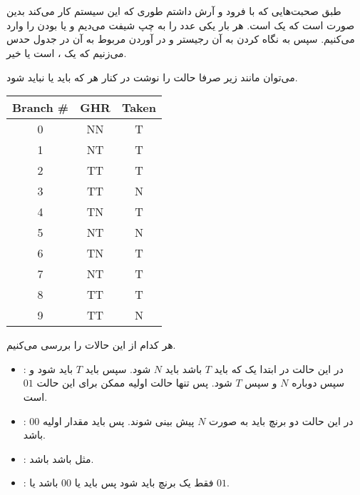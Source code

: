 \section{}
طبق صحبت‌هایی که با فرود و آرش داشتم طوری که این سیستم کار می‌کند بدین صورت است که
یک
است. هر بار یکی عدد را به چپ شیفت می‌دیم و
 یا 
بودن
را وارد می‌کنیم. سپس به نگاه کردن به آن رجیستر و در آوردن
مربوط به آن در جدول
حدس می‌زنیم که یک
،
است یا خیر.

می‌توان مانند زیر صرفا حالت
را نوشت در کنار هر
که باید یا نباید
شود.
\begin{latin}
\centering
\begin{tabular}{|c|c|c|}
    \hline
    Branch \# & GHR & Taken\\
    \hline
    0 & NN & T\\
    \hline
    1 & NT & T\\
    \hline
    2 & TT & T\\
    \hline
    3 & TT & N\\
    \hline
    4 & TN & T\\
    \hline
    5 & NT & N\\
    \hline
    6 & TN & T\\
    \hline
    7 & NT & T\\
    \hline
    8 & TT & T\\
    \hline
    9 & TT & N\\
    \hline
\end{tabular}
\end{latin}
هر کدام از این حالات
را بررسی می‌کنیم.
\begin{itemize}
    \item {}:‌ در این حالت در ابتدا یک
    که باید
    $T$
    باشد باید
    $N$
    شود. سپس باید
    $T$
    باید
    شود و سپس
    دوباره
    $N$ و سپس $T$
    شود. پس تنها حالت اولیه ممکن برای این حالت
    $01$
    است.
    \item {}: در این حالت دو برنچ باید به صورت
    $N$
    پیش بینی شوند. پس باید مقدار اولیه
    $00$
    باشد.
    \item {}: مثل  باشد باشد.
    \item {}: فقط یک برنچ باید   شود پس باید یا
    $00$ باشد یا $01$.
\end{itemize}

